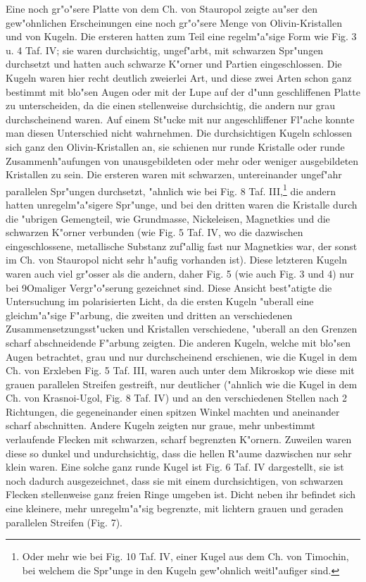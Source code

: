 \documentclass[a4paper, 11pt, oneside]{article}
\begin{document}
Eine noch gr"o"sere Platte von dem Ch. von Stauropol zeigte au"ser den gew"ohnlichen Erscheinungen eine noch gr"o"sere Menge von Olivin-Kristallen und von Kugeln. Die ersteren hatten zum Teil eine regelm"a"sige Form wie Fig. 3 u. 4 Taf. IV; sie waren durchsichtig, ungef"arbt, mit schwarzen Spr"ungen durchsetzt und hatten auch schwarze K"orner und Partien eingeschlossen. Die Kugeln waren hier recht deutlich zweierlei Art, und diese zwei Arten schon ganz bestimmt mit blo"sen Augen oder mit der Lupe auf der d"unn geschliffenen Platte zu unterscheiden, da die einen stellenweise durchsichtig, die andern nur grau durchscheinend waren. Auf einem St"ucke mit nur angeschliffener Fl"ache konnte man diesen Unterschied nicht wahrnehmen. Die durchsichtigen Kugeln schlossen sich ganz den Olivin-Kristallen an, sie schienen nur runde Kristalle oder runde Zusammenh"aufungen von unausgebildeten oder mehr oder weniger ausgebildeten Kristallen zu sein. Die ersteren waren mit schwarzen, untereinander ungef"ahr parallelen Spr"ungen durchsetzt, "ahnlich wie bei Fig. 8 Taf. III,\footnote{Oder mehr wie bei Fig. 10 Taf. IV, einer Kugel aus dem Ch. von Timochin, bei welchem die Spr"unge in den Kugeln gew"ohnlich weitl"aufiger sind.} die andern hatten unregelm"a"sigere Spr"unge, und bei den dritten waren die Kristalle durch die "ubrigen Gemengteil, wie Grundmasse, Nickeleisen, Magnetkies und die schwarzen K"orner verbunden (wie Fig. 5 Taf. IV, wo die dazwischen eingeschlossene, metallische Substanz zuf"allig fast nur Magnetkies war, der sonst im Ch. von Stauropol nicht sehr h"aufig vorhanden ist). Diese letzteren Kugeln waren auch viel gr"osser als die andern, daher Fig. 5 (wie auch Fig. 3 und 4) nur bei 9Omaliger Vergr"o"serung gezeichnet sind. Diese Ansicht best"atigte die Untersuchung im polarisierten Licht, da die ersten Kugeln "uberall eine gleichm"a"sige F"arbung, die zweiten und dritten an verschiedenen Zusammensetzungsst"ucken und Kristallen verschiedene, "uberall an den Grenzen scharf abschneidende F"arbung zeigten. Die anderen Kugeln, welche mit blo"sen Augen betrachtet, grau und nur durchscheinend erschienen, wie die Kugel in dem Ch. von Erxleben Fig. 5 Taf. III, waren auch unter dem Mikroskop wie diese mit grauen parallelen Streifen gestreift, nur deutlicher ("ahnlich wie die Kugel in dem Ch. von Krasnoi-Ugol, Fig. 8 Taf. IV) und an den verschiedenen Stellen nach 2 Richtungen, die gegeneinander einen spitzen Winkel machten und aneinander scharf abschnitten. Andere Kugeln zeigten nur graue, mehr unbestimmt verlaufende Flecken mit schwarzen, scharf begrenzten K"ornern. Zuweilen waren diese so dunkel und undurchsichtig, dass die hellen R"aume dazwischen nur sehr klein waren. Eine solche ganz runde Kugel ist Fig. 6 Taf. IV dargestellt, sie ist noch dadurch ausgezeichnet, dass sie mit einem durchsichtigen, von schwarzen Flecken stellenweise ganz freien Ringe umgeben ist. Dicht neben ihr befindet sich eine kleinere, mehr unregelm"a"sig begrenzte, mit lichtern grauen und geraden parallelen Streifen (Fig. 7).
\end{document}
